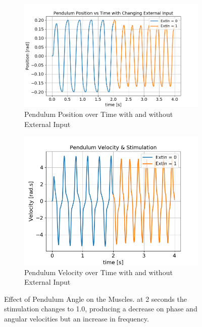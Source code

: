 \documentclass{cmc}
\begin{document}
\begin{figure}[H]
    \centering
    \begin{subfigure}[t]{0.5\textwidth}
        \centering
        \includegraphics[width=\textwidth]{3b/3b-position.png}
        \caption{Pendulum Position over Time with and without External Input}
    \end{subfigure}
    \hfill
    \begin{subfigure}[t]{0.48\textwidth}
        \centering
        \includegraphics[width=\textwidth]{3b/3b-vel.png}
        \caption{Pendulum Velocity over Time with and without External Input}
    \end{subfigure}
    \caption{Effect of Pendulum Angle on the Muscles. at 2 seconds the stimulation changes to 1.0, producing a decrease on phase and angular velocities but an increase in frequency. }
    \label{fig:3b_VelocityTimeSimulations}
\end{figure}
\end{document}
